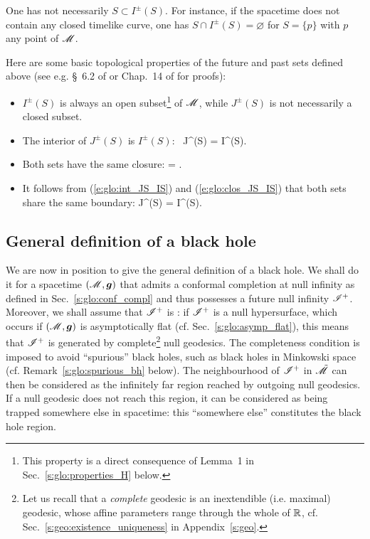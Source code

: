 \begin{remark}
One has not necessarily $S \subset I^\pm(S)$. For instance,
if the spacetime does not contain
any closed timelike curve, one has  $S \cap I^\pm(S) = \varnothing$ for
$S = \{p\}$ with $p$ any point of $\mathscr{M}$.
\end{remark}

Here are some basic topological properties of the future and past sets
defined above (see e.g. \S~6.2 of \cite{HawkiE73} or Chap.~14 of
\cite{ONeil83} for proofs):
\begin{itemize}
\item
$I^\pm(S)$ is always an open subset\footnote{This property is a direct
consequence of Lemma~1 in Sec.~\ref{s:glo:properties_H} below.} of $\mathscr{M}$, while
$J^\pm(S)$ is not necessarily a closed subset.
\item The interior of $J^\pm(S)$ is $I^\pm(S)$:
\be \label{e:glo:int_JS_IS}
    \, J^\pm(S) = I^\pm(S).
\ee
\item Both sets have the same closure:
\be \label{e:glo:clos_JS_IS}
     =  .
\ee
\item
It follows from (\ref{e:glo:int_JS_IS}) and (\ref{e:glo:clos_JS_IS})
that both sets share the same boundary:
\be \label{e:glo:boundary_JS_IS}
    \partial J^\pm(S) = \partial I^\pm(S).
\ee
\end{itemize}

\subsection{General definition of a black hole} \label{s:glo:def_BH}

We are now in position to give the general definition of a black hole.
We shall do it for a spacetime $(\mathscr{M},\bm{g})$ that admits a conformal completion
at null infinity as defined in Sec.~\ref{s:glo:conf_compl} and thus
possesses a future null infinity $\mathscr{I}^+$.
Moreover, we shall assume that $\mathscr{I}^+$ is : if $\mathscr{I}^+$
is a null hypersurface, which occurs if $(\mathscr{M},\bm{g})$ is asymptotically flat
(cf. Sec.~\ref{s:glo:asymp_flat}),
this means that $\mathscr{I}^+$ is generated by complete\footnote{Let us recall
that a \emph{complete} geodesic is an inextendible (i.e. maximal) geodesic,
whose affine parameters range through the whole of $\mathbb{R}$, cf. Sec.~\ref{s:geo:existence_uniqueness}
in Appendix~\ref{s:geo}.} null geodesics.
The completeness condition is imposed to avoid ``spurious'' black holes,
such as black holes in Minkowski space (cf. Remark~\ref{s:glo:spurious_bh} below).
The neighbourhood of $\mathscr{I}^+$
in $\tilde{\mathscr{M}}$ can then be considered as the infinitely far region
reached by outgoing null geodesics. If a null geodesic does not reach this
region, it can be considered as being trapped somewhere else in spacetime: this
``somewhere else'' constitutes the black hole region.

